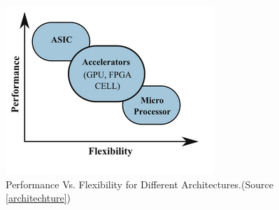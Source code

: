 \begin{figure}[!h]
\centering
\includegraphics[scale=0.65]{figures/performance.png}
\caption{Performance Vs. Flexibility for Different Architectures.(Source \ref{architechture})}
\label{fig:Performance}
\end{figure}
